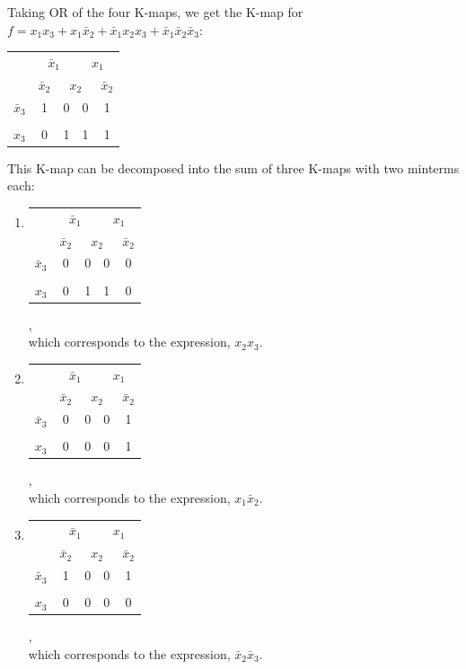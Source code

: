 \documentclass[twocolumn]{article}
\newcommand{\bx}{\bar{x}}
\begin{document}
Taking OR of the four K-maps, we get the K-map for $f=x_1 x_3 + x_1 \bx_2 + \bx_1 x_2 x_3 + \bx_1 \bx_2 \bx_3$:
\begin{tabular}{c|c|c|c|c}
  \toprule
  & \multicolumn{2}{c|}{$\bx_1$} & \multicolumn{2}{c}{$x_1$}
  \\
  & $\bx_2$ & \multicolumn{2}{c|}{$x_2$} & $\bx_2$ \\
  \midrule
  $\bx_3$ & 1 & 0 & 0 & 1\\
  \\
  $x_3$   & 0 & 1 & 1 & 1\\
  \bottomrule
\end{tabular}

This K-map can be decomposed into the sum of three K-maps with two minterms each:
\begin{enumerate}
  \item 
\begin{tabular}{c|c|c|c|c}
  \toprule
  & \multicolumn{2}{c|}{$\bx_1$} & \multicolumn{2}{c}{$x_1$}
  \\
  & $\bx_2$ & \multicolumn{2}{c|}{$x_2$} & $\bx_2$ \\
  \midrule
  $\bx_3$ & 0 & 0 & 0 & 0\\
  \\
  $x_3$   & 0 & 1 & 1 & 0\\
  \bottomrule
\end{tabular},
\\
which corresponds to the expression, $x_2 x_3$.

\item
\begin{tabular}{c|c|c|c|c}
  \toprule
  & \multicolumn{2}{c|}{$\bx_1$} & \multicolumn{2}{c}{$x_1$}
  \\
  & $\bx_2$ & \multicolumn{2}{c|}{$x_2$} & $\bx_2$ \\
  \midrule
  $\bx_3$ & 0 & 0 & 0 & 1\\
  \\
  $x_3$   & 0 & 0 & 0 & 1\\
  \bottomrule
\end{tabular},
\\
which corresponds to the expression, $x_1 \bx_2$.

\item
\begin{tabular}{c|c|c|c|c}
  \toprule
  & \multicolumn{2}{c|}{$\bx_1$} & \multicolumn{2}{c}{$x_1$}
  \\
  & $\bx_2$ & \multicolumn{2}{c|}{$x_2$} & $\bx_2$ \\
  \midrule
  $\bx_3$ & 1 & 0 & 0 & 1\\
  \\
  $x_3$   & 0 & 0 & 0 & 0\\
  \bottomrule
\end{tabular},
\\
which corresponds to the expression, $\bx_2 \bx_3$.
\end{enumerate}
\end{document}
